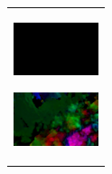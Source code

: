 \begin{figure}[htbp]
\begin{tabular}{l}
      \begin{minipage}{0.165\hsize}
        \begin{center}
          \includegraphics[clip, width=2.5cm]{./Figures/optic_drink4.eps}
          \hspace{0.1cm} { }
        \end{center}
      \end{minipage}
      \begin{minipage}{0.165\hsize}
        \begin{center}
          \includegraphics[clip, width=2.5cm]{./Figures/optic_drink5.eps}
          \hspace{2.2cm} { }
        \end{center}
      \end{minipage}
\\ %
    \end{tabular}
\end{figure}




